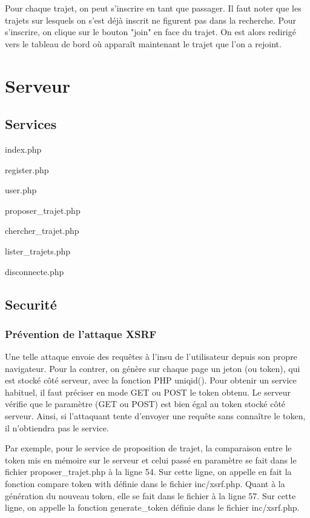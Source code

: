 \documentclass[a4paper]{article}
\begin{document}
Pour chaque trajet, on peut s'inscrire en tant que passager. Il faut noter que les trajets sur lesquels on s'est déjà inscrit ne figurent
pas dans la recherche. Pour s'inscrire, on clique sur le bouton "join" en face du trajet. On est alors redirigé vers le tableau de bord
où apparaît maintenant le trajet que l'on a rejoint.

\section{Serveur}

	\subsection{Services}
	
	index.php
	
	register.php
	
	user.php
	
	proposer\_trajet.php
	
	chercher\_trajet.php
	
	lister\_trajets.php
	
	disconnecte.php
	
	\subsection{Securité}
 		\subsubsection{Prévention de l'attaque XSRF}
 		
Une telle attaque envoie des requêtes à l'insu de l'utilisateur depuis son propre navigateur.
Pour la contrer, on génère sur chaque page un jeton (ou token), qui est stocké côté serveur, avec la fonction PHP uniqid().
Pour obtenir un service habituel, il faut préciser en mode GET ou POST le token obtenu.
Le serveur vérifie que le paramètre (GET ou POST) est bien égal au token stocké côté serveur.
Ainsi, si l'attaquant tente d'envoyer une requête sans connaître le token, il n'obtiendra
pas le service.

Par exemple, pour le service de proposition de trajet, la comparaison entre le token mis en mémoire
sur le serveur et celui passé en paramètre se fait dans le fichier proposer\_trajet.php à la ligne
54. Sur cette ligne, on appelle en fait la fonction compare token with définie dans le fichier
inc/xsrf.php. Quant à la génération du nouveau token, elle se fait dans le fichier à la ligne 57. 
Sur cette ligne, on appelle la fonction generate\_token définie dans le 
fichier inc/xsrf.php.
 		
\end{document}
